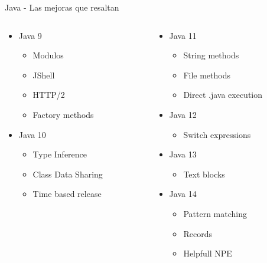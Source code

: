 \documentclass[aspectratio=169]{beamer}
\begin{document}
\begin{frame}[fragile]{Java - Las mejoras que resaltan}
	\begin{columns}[T] %
		
		\begin{column}[T]{5cm} %
			\begin{itemize}
				\item Java 9
				\begin{itemize}
					\item Modulos
					\item JShell
					\item HTTP/2
                    \item Factory methods
				\end{itemize}
				\item Java 10
				\begin{itemize}
					\item Type Inference
					\item Class Data Sharing
					\item Time based release
				\end{itemize}
			\end{itemize}
		\end{column}
		\begin{column}[T]{5cm} %
			\begin{itemize}
                \item Java 11
                \begin{itemize}
                    \item String methods
                    \item File methods
                    \item Direct .java execution
                \end{itemize}
				\item Java 12
				\begin{itemize}
					\item Switch expressions
				\end{itemize}
				\item Java 13
				\begin{itemize}
					\item Text blocks
				\end{itemize}
				\item Java 14
				\begin{itemize}
					\item Pattern matching
					\item Records
					\item Helpfull NPE
				\end{itemize}
			\end{itemize}
		\end{column}
	\end{columns}
\end{frame}
\end{document}
